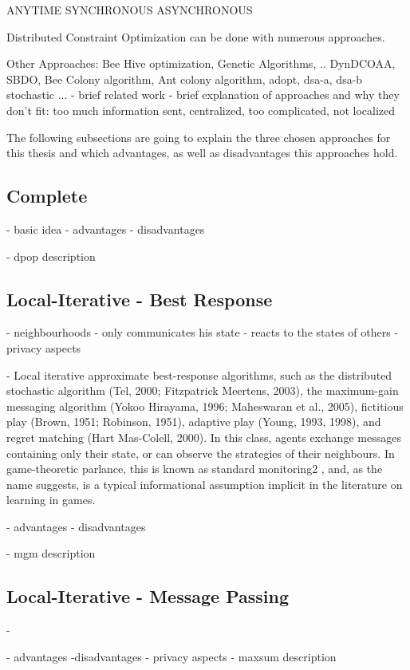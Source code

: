 ANYTIME
SYNCHRONOUS
ASYNCHRONOUS


Distributed Constraint Optimization can be done with numerous approaches.

Other Approaches: Bee Hive optimization, Genetic Algorithms, .. DynDCOAA, SBDO, Bee Colony algorithm, Ant colony algorithm, adopt, dsa-a, dsa-b stochastic ...
    - brief related work
    - brief explanation of approaches and why they don't fit: too much information sent, centralized, too complicated, not localized
    
    The following subsections are going to explain the three chosen approaches for this thesis and which advantages, as well as disadvantages this approaches hold.
    
    \cite{Likhachev}
    
\subsection{Complete}

\cite{Chapman2011}

    - basic idea
    - advantages
    - disadvantages
    
    - dpop description

\subsection{Local-Iterative - Best Response}

- neighbourhoods
- only communicates his state
- reacts to the states of others
- privacy aspects

\cite{Chapman2011}
\cite{Maheswaran} %

    - Local iterative approximate best-response algorithms, such as the distributed stochastic algorithm
(Tel, 2000; Fitzpatrick  Meertens, 2003), the maximum-gain messaging algorithm (Yokoo 
Hirayama, 1996; Maheswaran et al., 2005), fictitious play (Brown, 1951; Robinson, 1951),
adaptive play (Young, 1993, 1998), and regret matching (Hart  Mas-Colell, 2000). In this class,
agents exchange messages containing only their state, or can observe the strategies of their
neighbours. In game-theoretic parlance, this is known as standard monitoring2
, and, as the name
suggests, is a typical informational assumption implicit in the literature on learning in games.


    - advantages
    - disadvantages
    
    - mgm description

\subsection{Local-Iterative - Message Passing}
    
    \cite{Chapman2011}
    - 
    
    - advantages
    -disadvantages
    - privacy aspects
    - maxsum description
    
    